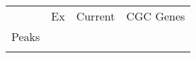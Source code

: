 \begin{tabular}{lccr}
\toprule
{} & Ex & Current & CGC Genes \\
Peaks &    &         &           \\
\midrule
      &    &         &           \\
\bottomrule
\end{tabular}

